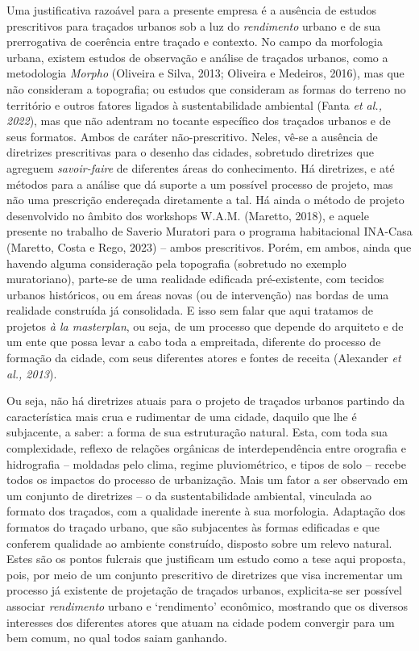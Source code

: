 \documentclass[]{report}
\begin{document}
	Uma justificativa razoável para a presente empresa é a ausência de estudos prescritivos para traçados urbanos sob a luz do \textit{rendimento} urbano e de sua prerrogativa de coerência entre traçado e contexto. No campo da morfologia urbana, existem estudos de observação e análise de traçados urbanos, como a metodologia \textit{Morpho} (Oliveira e Silva, 2013; Oliveira e Medeiros, 2016), mas que não consideram a topografia; ou estudos que consideram as formas do terreno no território e outros fatores ligados à sustentabilidade ambiental (Fanta \textit{et al., 2022}), mas que não adentram no tocante específico dos traçados urbanos e de seus formatos. Ambos de caráter não-prescritivo. Neles, vê-se a ausência de diretrizes prescritivas para o desenho das cidades, sobretudo diretrizes que agreguem \textit{savoir-faire} de diferentes áreas do conhecimento. Há diretrizes, e até métodos para a análise que dá suporte a um possível processo de projeto, mas não uma prescrição endereçada diretamente a tal. Há ainda o método de projeto desenvolvido no âmbito dos workshops W.A.M. (Maretto, 2018), e aquele presente no trabalho de Saverio Muratori para o programa habitacional INA-Casa (Maretto, Costa e Rego, 2023) – ambos prescritivos. Porém, em ambos, ainda que havendo alguma consideração pela topografia (sobretudo no exemplo muratoriano), parte-se de uma realidade edificada pré-existente, com tecidos urbanos históricos, ou em áreas novas (ou de intervenção) nas bordas de uma realidade construída já consolidada. E isso sem falar que aqui tratamos de projetos \textit{à la masterplan}, ou seja, de um processo que depende do arquiteto e de um ente que possa levar a cabo toda a empreitada, diferente do processo de formação da cidade, com seus diferentes atores e fontes de receita (Alexander \textit{et al., 2013}).

	Ou seja, não há diretrizes atuais para o projeto de traçados urbanos partindo da característica mais crua e rudimentar de uma cidade, daquilo que lhe é subjacente, a saber: a forma de sua estruturação natural. Esta, com toda sua complexidade, reflexo de relações orgânicas de interdependência entre orografia e hidrografia – moldadas pelo clima, regime pluviométrico, e tipos de solo – recebe todos os impactos do processo de urbanização. Mais um fator a ser observado em um conjunto de diretrizes – o da sustentabilidade ambiental, vinculada ao formato dos traçados, com a qualidade inerente à sua morfologia. Adaptação dos formatos do traçado urbano, que são subjacentes às formas edificadas e que conferem qualidade ao ambiente construído, disposto sobre um relevo natural. Estes são os pontos fulcrais que justificam um estudo como a tese aqui proposta, pois, por meio de um conjunto prescritivo de diretrizes que visa incrementar um processo já existente de projetação de traçados urbanos, explicita-se ser possível associar \textit{rendimento} urbano e ‘rendimento’ econômico, mostrando que os diversos interesses dos diferentes atores que atuam na cidade podem convergir para um bem comum, no qual todos saiam ganhando.
\end{document}
